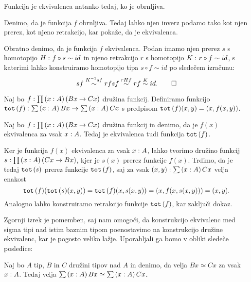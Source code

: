 \begin{trditev}
  \label{inv-of-equiv}
  Funkcija je ekvivalenca natanko tedaj, ko je obrnljiva.
\end{trditev}

\begin{dokaz}
  Denimo, da je funkcija \(f\) obrnljiva. Tedaj lahko njen inverz podamo tako kot njen
  prerez, kot njeno retrakcijo, kar pokaže, da je ekvivalenca.

  Obratno denimo, da je funkcija \(f\) ekvivalenca. Podan imamo njen prerez \(s\) s
  homotopijo \(H \,\colon f \circ s \sim id\) in njeno retrakcijo \(r\) s homotopijo
  \(K \,\colon r \circ f \sim id\), s katerimi lahko konstruiramo homotopijo tipa
  \(s \circ f \sim id\) po sledečem izračunu:
  \[s f \overset{K^{-1}sf}{\sim} r f s f \overset{rHf}{\sim} r f \overset{K}{\sim} id. \qedhere\]
\end{dokaz}

\begin{definicija}
  Naj bo \(f : \prod \left( x : A \right) \left(Bx \to Cx\right)\) družina funkcij.
  Definiramo funkcijo
  \(\textnormal{\texttt{tot}}\,(f) : \sum \left( x : A \right) Bx \to \sum \left( x : A \right) Cx\) s predpisom
  \(\textnormal{\texttt{tot}}\,(f)(x, y) = (x, f(x, y))\).
\end{definicija}

\begin{izrek}
  Naj bo \(f : \prod \left( x : A \right) \left(Bx \to Cx\right)\) družina funkcij
  in denimo, da je \(f(x)\) ekvivalenca za vsak \(x : A\). Tedaj je
  ekvivalenca tudi funkcija \(\textnormal{\texttt{tot}}\,(f)\).
\end{izrek}

\begin{dokaz}
  Ker je funkcija \(f(x)\) ekvivalenca za vsak \(x : A\),
  lahko tvorimo družino funkcij
  \(s : \prod \left( x : A \right) \left(Cx \to Bx\right)\), kjer je \(s(x)\)
  prerez funkcije \(f(x)\).
  Trdimo, da je tedaj \(\textnormal{\texttt{tot}}\,(s)\) prerez funkcije \(\textnormal{\texttt{tot}}\,(f)\), saj
  za vsak \((x, y) : \sum \left( x : A \right) Cx\) velja enakost
  \[\textnormal{\texttt{tot}}\,(f)(\textnormal{\texttt{tot}}\,(s)(x, y)) = \textnormal{\texttt{tot}}\,(f)(x, s(x, y)) = (x, f(x, s(x, y))) = (x, y).\]
  Analogno lahko konstruiramo retrakcijo funkcije \(\textnormal{\texttt{tot}}\,(f)\), kar zaključi dokaz.
\end{dokaz}

Zgornji izrek je pomemben, saj nam omogoči, da konstrukcijo ekvivalenc med sigma tipi
nad istim baznim tipom poenostavimo na konstrukcijo družine ekvivalenc, kar je pogosto
veliko lažje. Uporabljali ga bomo v obliki sledeče posledice:

\begin{posledica}
  \label{equiv-tot}
  Naj bo \(A\) tip, \(B\) in \(C\) družini tipov nad \(A\) in denimo, da velja
  \(Bx \simeq Cx\) za vsak \(x : A\).
  Tedaj velja \(\sum \left( x : A \right) Bx \simeq \sum \left( x : A \right) Cx\).
\end{posledica}

